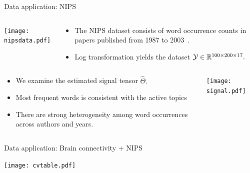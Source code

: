\documentclass[10pt, mathserif]{beamer} %
\theoremstyle{definition}
\theoremstyle{plain}
\begin{document}
\begin{frame}{Data application: NIPS}
    \begin{columns}
\begin{column}{0.21\textwidth}
   \begin{center}
     \texttt{[image: nipsdata.pdf]}
     \end{center}
\end{column}
\begin{column}{0.7\textwidth} 
\begin{itemize}
    \item The NIPS dataset consists of word occurrence counts in papers published from 1987 to 2003~\citep{globerson2007euclidean}.
    \item Log transformation yields the dataset $\mathcal{Y}\in\mathbb{R}^{100\times200\times17}.$ 
\end{itemize}
\end{column}
\end{columns}

\begin{columns}
\begin{column}{0.6\textwidth}
 \begin{itemize}
     \item We examine the estimated signal tensor $\hat\Theta.$
     \item Most frequent words is consistent with the active topics
     \item There are strong heterogeneity among word occurrences across authors and years.
 \end{itemize}
\end{column}
\begin{column}{0.4\textwidth} 
   \begin{center}
     \texttt{[image: signal.pdf]}
     \end{center}
\end{column}
\end{columns}
\end{frame}

\begin{frame}{Data application: Brain connectivity + NIPS}
      \begin{center}
     \begin{table}
    \texttt{[image: cvtable.pdf]}
    \caption{MAE comparison in the brain data and NIPS data on cross-validation (5 repetitions 5 folds).  Standard errors are reported in parenthesis.}
    \end{table}
    \end{center}
\end{frame}
\end{document}
